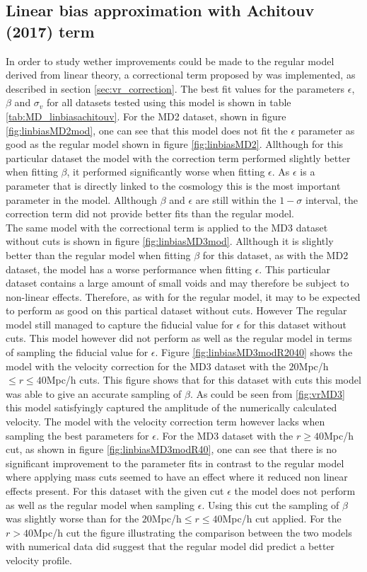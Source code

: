 \subsection{Linear bias approximation with Achitouv (2017) term}
In order to study wether improvements could be made to the regular model derived from linear theory, a correctional term proposed by \cite{Achitouv_streaming} was implemented, as described in section \ref{sec:vr_correction}. The best fit values for the parameters $\epsilon$, $\beta$ and $\sigma_v$ for all datasets tested using this model is shown in table \ref{tab:MD_linbiasachitouv}. For the MD2 dataset, shown in figure \ref{fig:linbiasMD2mod}, one can see that this model does not fit the $\epsilon$ parameter as good as the regular model shown in figure \ref{fig:linbiasMD2}. Allthough for this particular dataset the model with the correction term performed slightly better when fitting $\beta$, it performed significantly worse when fitting $\epsilon$. As $\epsilon$ is a  parameter that is directly linked to the cosmology this is the most important parameter in the model. Allthough $\beta$ and $\epsilon$ are still within the $1-\sigma$ interval, the correction term did not provide better fits than the regular model.\\\indent
The same model with the correctional term is applied to the MD3 dataset without cuts is shown in figure \ref{fig:linbiasMD3mod}. Allthough it is slightly better than the regular model when fitting $\beta$ for this dataset, as with the MD2 dataset, the model has a worse performance when fitting $\epsilon$. This particular dataset contains a large amount of small voids and may therefore be subject to non-linear effects. Therefore, as with for the regular model, it may to be expected to perform as good on this partical dataset without cuts. However The regular model still managed to 
capture the fiducial value for $\epsilon$ for this dataset without cuts. This model however did not perform as well as the regular model in terms of sampling the fiducial value for $\epsilon$.
Figure \ref{fig:linbiasMD3modR2040} shows the model with the velocity correction for the MD3 dataset with the $20$Mpc/h$\leq r\leq 40$Mpc/h cuts. This figure shows that for this dataset with cuts this model was able to give an accurate sampling of $\beta$. As could be seen from \ref{fig:vrMD3} this model satisfyingly captured the amplitude of the numerically calculated velocity. The model with the velocity correction term however lacks when sampling the best parameters for $\epsilon$. For the MD3 dataset with the $r \geq 40$Mpc/h cut, as shown in figure \ref{fig:linbiasMD3modR40}, one can see that there is no significant improvement to the parameter fits in contrast to the regular model where applying mass cuts seemed to have an effect where it reduced non linear effects present. For this dataset with the given cut $\epsilon$ the model does not perform as well as the regular model when sampling $\epsilon$. Using this cut the sampling of $\beta$ was slightly worse than for the $20$Mpc/h$\leq r\leq 40$Mpc/h cut applied. For the $r>40$Mpc/h cut the figure illustrating the comparison between the two models with numerical data did suggest that the regular model did predict a better velocity profile.

